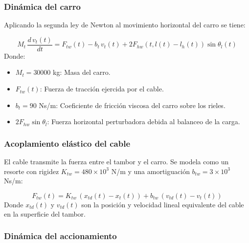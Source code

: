 \documentclass{article}
\begin{document}
\subsubsection{Dinámica del carro}
Aplicando la segunda ley de Newton al movimiento horizontal del carro se tiene:

\begin{equation}
    M_t \, \frac{d \, v_t(t)}{dt} = F_{tw}(t) - b_t \, v_t(t) + 2 F_{hw}(t, l(t)-l_h(t))\sin\theta_l(t)
\end{equation}
Donde:
\begin{itemize}
    \item $M_t = 30000$ kg: Masa del carro.

    \item $F_{tw}(t)$: Fuerza de tracción ejercida por el cable.
    
    \item $b_t = 90$ Ns/m: Coeficiente de fricción viscosa del carro sobre los rieles.
    
    \item $2F_{hw}\sin\theta_l$: Fuerza horizontal perturbadora debida al balanceo de la carga.
\end{itemize}

\subsubsection{Acoplamiento elástico del cable}

El cable transmite la fuerza entre el tambor y el carro. Se modela como un resorte con rigidez $K_{tw} = 480 \times 10^3$ N/m y una amortiguación $b_{tw} = 3 \times 10^3$ Ns/m:


\begin{equation}
    F_{tw}(t) = K_{tw} \, (x_{td}(t) - x_t(t)) + b_{tw} \, (v_{td}(t) - v_t(t))
\end{equation}
Donde $x_{td}(t)$ y $v_{td}(t)$ son la posición y velocidad lineal equivalente del cable en la superficie del tambor.

\subsubsection{Dinámica del accionamiento}
\end{document}
